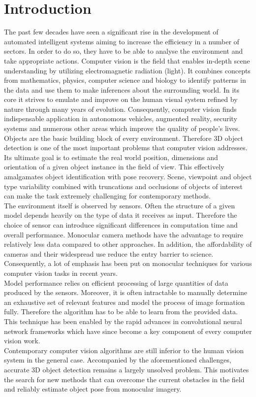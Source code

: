 \documentclass[main.tex]{subfiles}
\begin{document}
\section{Introduction}
\indent The past few decades have seen a significant rise in the development of automated intelligent systems aiming to increase the efficiency in a number of sectors. In order to do so, they have to be able to analyse the environment and take appropriate actions. Computer vision is the field that enables in-depth scene understanding by utilizing electromagnetic radiation (light). It combines concepts from mathematics, physics, computer science and biology to identify patterns in the data and use them to make inferences about the surrounding world. In its core it strives to emulate and improve on the human visual system refined by nature through many years of evolution. Consequently, computer vision finds indispensable application in autonomous vehicles, augmented reality, security systems and numerous other areas which improve the quality of people's lives. \\
\indent Objects are the basic building block of every environment. Therefore 3D object detection is one of the most important problems that computer vision addresses. Its ultimate goal is to estimate the real world position, dimensions and orientation of a given object instance in the field of view. This effectively amalgamates object identification with pose recovery. Scene, viewpoint and object type variability combined with truncations and occlusions of objects of interest can make the task extremely challenging for contemporary methods. \\
\indent The environment itself is observed by sensors. Often the structure of a given model depends heavily on the type of data it receives as input. Therefore the choice of sensor can introduce significant differences in computation time and overall performance. Monocular camera methods have the advantage to require relatively less data compared to other approaches. In addition, the affordability of cameras and their widespread use reduce the entry barrier to science. Consequently, a lot of emphasis has been put on monocular techniques for various computer vision tasks in recent years.\\
\indent Model performance relies on efficient processing of large quantities of data produced by the sensors. Moreover, it is often intractable to manually determine an exhaustive set of relevant features and model the process of image formation fully. Therefore the algorithm has to be able to learn from the provided data. This technique has been enabled by the rapid advances in convolutional neural network frameworks which have since become a key component of every computer vision work.\\
\indent Contemporary computer vision algorithms are still inferior to the human vision system in the general case. Accompanied by the aforementioned challenges, accurate 3D object detection remains a largely unsolved problem. This motivates the search for new methods that can overcome the current obstacles in the field and reliably estimate object pose from monocular imagery.
\end{document}
